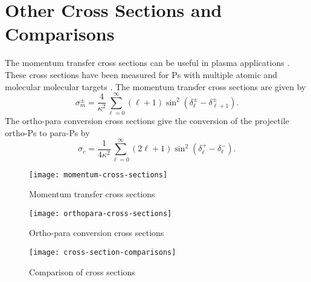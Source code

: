 \documentclass[Dissertation.tex]{subfiles}
\begin{document}
\section{Other Cross Sections and Comparisons}
\label{sec:OtherCross}

The momentum transfer cross sections can be useful in plasma applications \cite{Wang2014, McEachran2014}. These cross sections have been measured for Ps with multiple atomic and molecular molecular targets \cite{Nagashima1998,Saito2003}. The momentum transfer cross sections are given by \cite{Bransden2003}
\begin{equation}
\label{eq:MomentumCross}
\sigma_{m}^\pm = \frac{4}{\kappa^2} \sum_{\ell=0}^\infty (\ell+1) \sin^2 (\delta_\ell^\pm - \delta_{\ell+1}^\pm) .
\end{equation}
The ortho-para conversion cross sections give the conversion of the projectile ortho-Ps to para-Ps by \cite{Hara1975}
\begin{equation}
\label{eq:OrthoParaCross}
\sigma_{c} = \frac{1}{4 \kappa^2} \sum_{\ell=0}^\infty (2 \ell+1) \sin^2 (\delta_\ell^+ - \delta_\ell^-).
\end{equation}

\begin{figure}[H]
	\centering
	\texttt{[image: momentum-cross-sections]}
	\caption{Momentum transfer cross sections}
	\label{fig:momentum-cross-sections}
\end{figure}

\begin{figure}[H]
	\centering
	\texttt{[image: orthopara-cross-sections]}
	\caption{Ortho-para conversion cross sections}
	\label{fig:orthopara-cross-sections}
\end{figure}

\begin{figure}[H]
	\centering
	\texttt{[image: cross-section-comparisons]}
	\caption{Comparison of cross sections}
	\label{fig:cross-section-comparisons}
\end{figure}





\biblio
\end{document}
